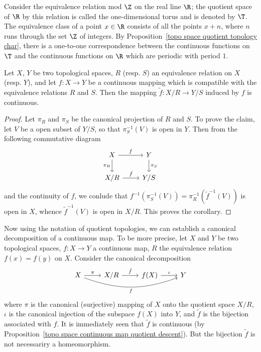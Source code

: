 \begin{example}
Consider the equivalence relation mod $\Z$ on the real line $\R$; the quotient space of $\R$ by this relation is called the one-dimensional torus and is denoted by $\T$. The equivalence class of a point $x\in\R$ consists of all the points $x+n$, where $n$ runs through the set $\Z$ of integers. By Proposition~\ref{topo space quotient topology char}, there is a one-to-one correspondence between the continuous functions on $\T$ and the continuous functions on $\R$ which are periodic with period $1$.
\end{example}
\begin{corollary}\label{topo space continuous map quotient descent}
Let $X$, $Y$ be two topological spaces, $R$ (resp. $S$) an equivalence relation on $X$ (resp. $Y$), and let $f:X\to Y$ be a continuous mapping which is compatible with the equivalence relations $R$ and $S$. Then the mapping $\tilde{f}:X/R\to Y/S$ induced by $f$ is continuous.
\end{corollary}
\begin{proof}
Let $\pi_R$ and $\pi_S$ be the canonical projection of $R$ and $S$. To prove the claim, let $V$ be a open subset of $Y/S$, so that $\pi_S^{-1}(V)$ is open in $Y$. Then from the following commutative diagram 
\[\begin{tikzcd}
X\ar[d,swap,"\pi_R"]\ar[r,"f"]&Y\ar[d,"\pi_S"]\\
X/R\ar[r,"\tilde{f}"]&Y/S
\end{tikzcd}\]
and the continuity of $f$, we conlude that $f^{-1}(\pi_S^{-1}(V))=\pi_R^{-1}(\tilde{f}^{-1}(V))$ is open in $X$, whence $\tilde{f}^{-1}(V)$ is open in $X/R$. This proves the corollary.
\end{proof}
Now using the notation of quotient topologies, we can establish a canonical decomposition of a continuous map. To be more precise, let $X$ and $Y$ be two topological spaces, $f:X\to Y$ a continuous map, $R$ the equivalence relation $f(x)=f(y)$ on $X$. Consider the canonical decomposition
\[\begin{tikzcd}
X\ar[rrr,bend right=20pt,swap,"f"]\ar[r,"\pi"]&X/R\ar[r,"\tilde{f}"]&f(X)\ar[r,"\iota"]&Y
\end{tikzcd}\]
where $\pi$ is the canonical (surjective) mapping of $X$ onto the quotient space $X/R$, $\iota$ is the canonical injection of the subspace $f(X)$ into $Y$, and $\tilde{f}$ is the bijection associated with $f$. It is immediately seen that $\tilde{f}$ is continuous (by Proposition~\ref{topo space continuous map quotient descent}). But the bijection $\tilde{f}$ is not necessariry a homeomorphism.
